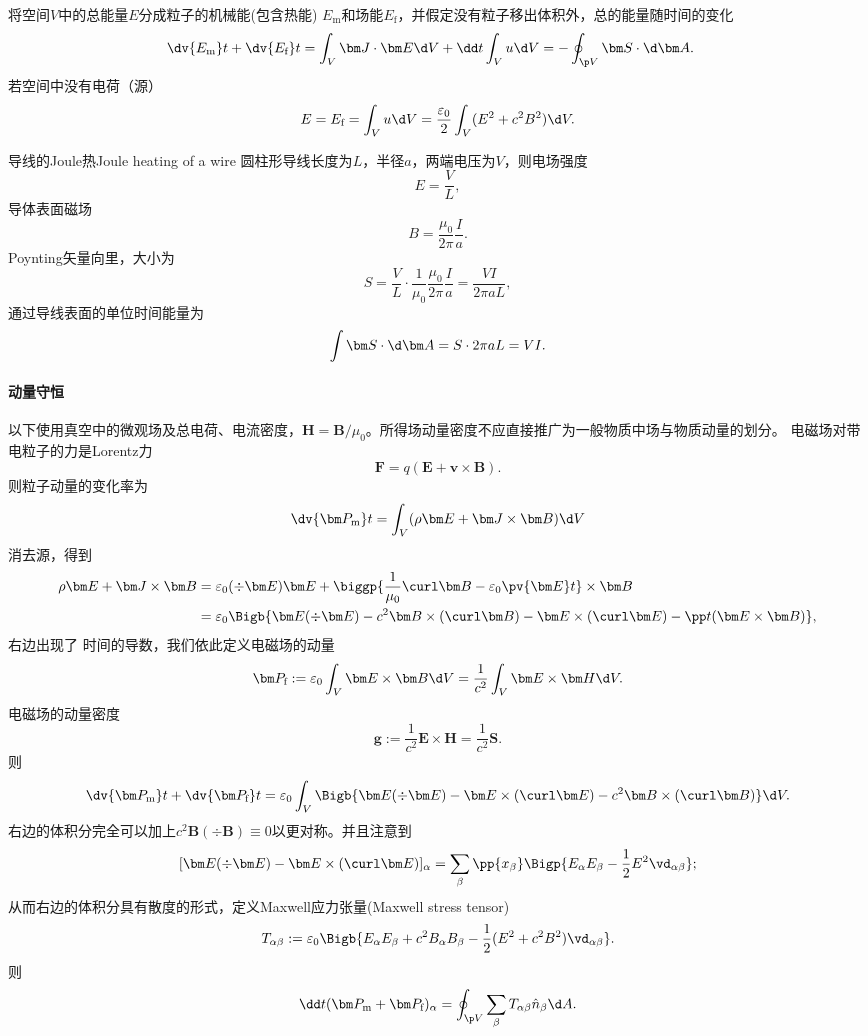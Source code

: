 将空间$V$中的总能量$E$分成粒子的机械能(包含热能) $E_\text{m}$和场能$E_\text{f}$，并假定没有粒子移出体积外，总的能量随时间的变化
\begin{align*}
    \dv{E_\text m}t+\dv{E_\text f}t&=\int_V\bm J\cdot\bm E\d V+\dd t\int_Vu\d V=-\oint_{\p V}\bm S\cdot\d\bm A.
\end{align*}
若空间中没有电荷（源）
\[
    E=E_\text f=\int_Vu\d V=\frac{\varepsilon_0}2\int_V(E^2+c^2B^2)\d V.
\]
\begin{example}{导线的Joule热}{Joule heating of a wire}
    圆柱形导线长度为$L$，半径$a$，两端电压为$V$，则电场强度
    \[
        E=\frac VL,
    \]
    导体表面磁场
    \[
        B=\frac{\mu_0}{2\pi}\frac Ia.
    \]
    Poynting矢量向里，大小为
    \[
        S=\frac VL\cdot\frac1{\mu_0}\frac{\mu_0}{2\pi}\frac Ia=\frac{VI}{2\pi aL},
    \]
    通过导线表面的单位时间能量为
    \[
        \int \bm S\cdot\d\bm A=S\cdot 2\pi aL=VI.
    \]
\end{example}
\paragraph{动量守恒}
以下使用真空中的微观场及总电荷、电流密度，$\bm H=\bm B/\mu_0$。所得场动量密度不应直接推广为一般物质中场与物质动量的划分。
电磁场对带电粒子的力是Lorentz力
\[
    \bm F=q(\bm E+\bm v\times\bm B).
\]
则粒子动量的变化率为
\[
    \dv{\bm P_\text m}t=\int_V(\rho\bm E+\bm J\times\bm B)\d V
\]
消去源，得到
\begin{align*}
    \rho\bm E+\bm J\times\bm B&=\varepsilon_0(\div\bm E)\bm E+\biggp{\frac1{\mu_0}\curl\bm B-\varepsilon_0\pv{\bm E}t}\times\bm B\\
    &=\varepsilon_0\Bigb{\bm E(\div\bm E)-c^2\bm B\times(\curl\bm B)-\bm E\times(\curl\bm E)-\pp t(\bm E\times\bm B)},
\end{align*}
右边出现了%
时间的导数，我们依此定义电磁场的动量
\[
    \bm P_\text f:=\varepsilon_0\int_V\bm E\times\bm B\d V=\frac1{c^2}\int_V\bm E\times\bm H\d V.
\]
电磁场的动量密度
\[
    \bm g:=\frac1{c^2}\bm E\times\bm H=\frac1{c^2}\bm S.
\]
则
\[
    \dv{\bm P_\text m}t+\dv{\bm P_\text f}t=\varepsilon_0\int_V\Bigb{\bm E(\div\bm E)-\bm E\times(\curl\bm E)-c^2\bm B\times(\curl\bm B)}\d V.
\]
右边的体积分完全可以加上$c^2\bm B(\div\bm B)\equiv 0$以更对称。并且注意到
\[
    [\bm E(\div\bm E)-\bm E\times(\curl\bm E)]_\alpha=\sum_\beta\pp{x_\beta}\Bigp{E_\alpha E_\beta-\frac12E^2\vd_{\alpha\beta}};
\]
从而右边的体积分具有散度的形式，定义Maxwell应力张量(Maxwell stress tensor)
\begin{equation}
    T_{\alpha\beta}:=\varepsilon_0\Bigb{E_\alpha E_\beta+c^2B_\alpha B_\beta-\frac12(E^2+c^2B^2)\vd_{\alpha\beta}}.
\end{equation}
则
\[
    \dd t({\bm P_\text m}+{\bm P_\text f})_\alpha=\oint_{\p V}\sum_\beta T_{\alpha\beta}\hat n_\beta\d A.
\]
